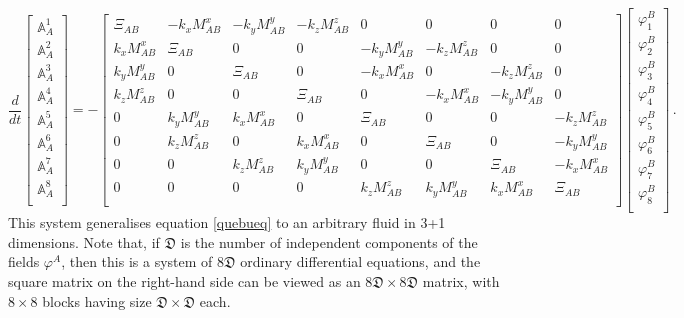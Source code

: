 \documentclass[a4paper, amsfonts, amssymb, amsmath, reprint, showkeys, nofootinbib, twoside, onecolumn,notitlepage]{revtex4-1}
\begin{document}
\begin{equation}\label{ordinariocomeilgrasso}
\dfrac{d}{dt} 
\begin{bmatrix}
\mathbb{A}_A^1 \\[3pt]
\mathbb{A}_A^2 \\[3pt]
\mathbb{A}_A^3 \\[3pt]
\mathbb{A}_A^4 \\[3pt]
\mathbb{A}_A^5 \\[3pt]
\mathbb{A}_A^6 \\[3pt]
\mathbb{A}_A^7 \\[3pt]
\mathbb{A}_A^8 \\[3pt]
\end{bmatrix}
= -
\begin{bmatrix}
\Xi_{AB} & -k_x M^x_{AB} & -k_y M^y_{AB} & -k_z M^z_{AB} & 0 & 0 & 0 & 0\\[3pt]
k_x M^x_{AB} & \Xi_{AB}  & 0 & 0 & -k_y M^y_{AB} & -k_z M^z_{AB} & 0 & 0\\[3pt]
k_y M^y_{AB} & 0 & \Xi_{AB}  & 0 & -k_x M^x_{AB} & 0 & -k_z M^z_{AB} & 0\\[3pt]
k_z M^z_{AB} & 0 & 0 & \Xi_{AB}  & 0 & -k_x M^x_{AB} & -k_y M^y_{AB} & 0\\[3pt]
0 & k_y M^y_{AB} & k_xM^x_{AB} & 0 & \Xi_{AB}  & 0 & 0 & -k_z M^z_{AB} \\[3pt]
0 & k_z M^z_{AB} & 0 & k_x M^x_{AB} & 0 & \Xi_{AB}  & 0 & -k_y M^y_{AB}\\[3pt]
0 & 0 & k_z M^z_{AB} & k_y M^y_{AB} & 0 & 0 & \Xi_{AB}  & -k_x M^x_{AB}\\[3pt]
0 & 0 & 0 & 0 & k_z M^z_{AB} & k_y M^y_{AB} & k_x M^x_{AB} & \Xi_{AB} \\[3pt]
\end{bmatrix}
\begin{bmatrix}
\varphi_1^B \\[3pt]
\varphi_2^B \\[3pt]
\varphi_3^B \\[3pt]
\varphi_4^B \\[3pt]
\varphi_5^B \\[3pt]
\varphi_6^B \\[3pt]
\varphi_7^B \\[3pt]
\varphi_8^B \\[3pt]
\end{bmatrix} \, .
\end{equation}
This system generalises equation \eqref{quebueq} to an arbitrary fluid in 3+1 dimensions. Note that, if $\mathfrak{D}$ is the number of independent components of the fields $\varphi^A$, then this is a system of $8\mathfrak{D}$ ordinary differential equations, and the square matrix on the right-hand side can be viewed as an $8\mathfrak{D}\times 8\mathfrak{D}$ matrix, with $8\times 8$ blocks having size $\mathfrak{D}\times \mathfrak{D}$ each.
\end{document}

